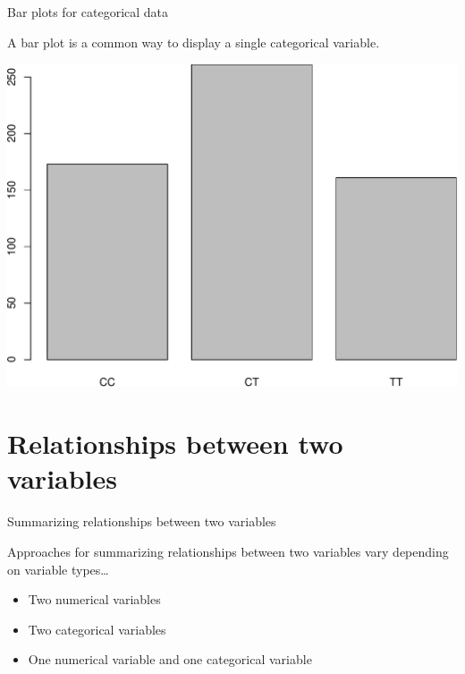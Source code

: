 \documentclass[
  ignorenonframetext,
]{beamer}
\newenvironment{Shaded}{\begin{snugshade}}{\end{snugshade}}
\newcommand{\KeywordTok}[1]{\textcolor[rgb]{0.13,0.29,0.53}{\textbf{#1}}}
\newcommand{\NormalTok}[1]{#1}
\newcommand{\OperatorTok}[1]{\textcolor[rgb]{0.81,0.36,0.00}{\textbf{#1}}}
\begin{document}
\begin{frame}[fragile]{Bar plots for categorical data}
\protect\hypertarget{bar-plots-for-categorical-data}{}

A bar plot is a common way to display a single categorical variable.

\small

\scriptsize

\begin{Shaded}
\end{Shaded}

\begin{center}\includegraphics[width=1\linewidth]{001-exploring-data_files/figure-beamer/unnamed-chunk-8-1} \end{center}

\normalsize

\end{frame}

\hypertarget{relationships-between-two-variables}{%
\section{Relationships between two
variables}\label{relationships-between-two-variables}}

\begin{frame}{Summarizing relationships between two variables}
\protect\hypertarget{summarizing-relationships-between-two-variables}{}

Approaches for summarizing relationships between two variables vary
depending on variable types\ldots{}

\begin{itemize}
\item
  Two numerical variables
\item
  Two categorical variables
\item
  One numerical variable and one categorical variable
\end{itemize}

\end{frame}
\end{document}
